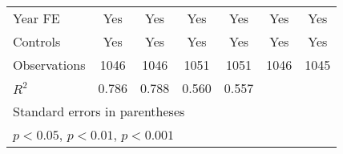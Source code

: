 \begin{table}[htbp]
\begin{tabular}{l*{6}{c}}
\addlinespace
Year FE         &      Yes         &      Yes         &      Yes         &      Yes         &      Yes         &      Yes         \\
\addlinespace
Controls        &      Yes         &      Yes         &      Yes         &      Yes         &      Yes         &      Yes         \\
\midrule
Observations    &     1046         &     1046         &     1051         &     1051         &     1046         &     1045         \\
\(R^{2}\)       &    0.786         &    0.788         &    0.560         &    0.557         &                  &                  \\
\bottomrule
\multicolumn{7}{l}{\footnotesize Standard errors in parentheses}\\
\multicolumn{7}{l}{\footnotesize \sym{*} \(p<0.05\), \sym{**} \(p<0.01\), \sym{***} \(p<0.001\)}\\
\end{tabular}
\end{table}
